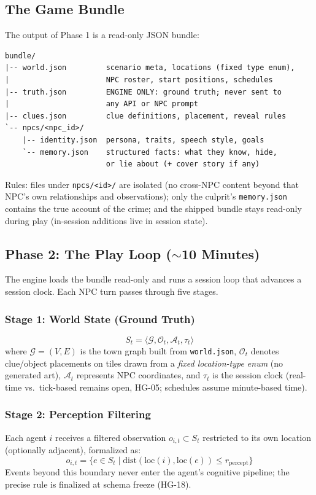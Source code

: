 \documentclass[11pt,a4paper]{article}
\begin{document}
\subsection{The Game Bundle}
The output of Phase 1 is a read-only JSON bundle:

\begin{lstlisting}[caption={Game Bundle Layout (output of Phase 1)}]
bundle/
|-- world.json         scenario meta, locations (fixed type enum),
|                      NPC roster, start positions, schedules
|-- truth.json         ENGINE ONLY: ground truth; never sent to
|                      any API or NPC prompt
|-- clues.json         clue definitions, placement, reveal rules
`-- npcs/<npc_id>/
    |-- identity.json  persona, traits, speech style, goals
    `-- memory.json    structured facts: what they know, hide,
                       or lie about (+ cover story if any)
\end{lstlisting}

Rules: files under \texttt{npcs/<id>/} are isolated (no cross-NPC content beyond that NPC's own relationships and observations); only the culprit's \texttt{memory.json} contains the true account of the crime; and the shipped bundle stays read-only during play (in-session additions live in session state).

\subsection{Phase 2: The Play Loop ($\sim$10 Minutes)}
The engine loads the bundle read-only and runs a session loop that advances a session clock. Each NPC turn passes through five stages.

\subsubsection{Stage 1: World State (Ground Truth)}
\begin{equation}
    S_t = \langle \mathcal{G}, \mathcal{O}_t, \mathcal{A}_t, \tau_t \rangle
\end{equation}
where $\mathcal{G} = (V, E)$ is the town graph built from \texttt{world.json}, $\mathcal{O}_t$ denotes clue/object placements on tiles drawn from a \emph{fixed location-type enum} (no generated art), $\mathcal{A}_t$ represents NPC coordinates, and $\tau_t$ is the session clock (real-time vs.\ tick-based remains open, HG-05; schedules assume minute-based time).

\subsubsection{Stage 2: Perception Filtering}
Each agent $i$ receives a filtered observation $o_{i,t} \subset S_t$ restricted to its own location (optionally adjacent), formalized as:
\begin{equation}
    o_{i, t} = \{ e \in S_t \mid \text{dist}(\text{loc}(i), \text{loc}(e)) \le r_{\text{percept}} \}
\end{equation}
Events beyond this boundary never enter the agent's cognitive pipeline; the precise rule is finalized at schema freeze (HG-18).
\end{document}
